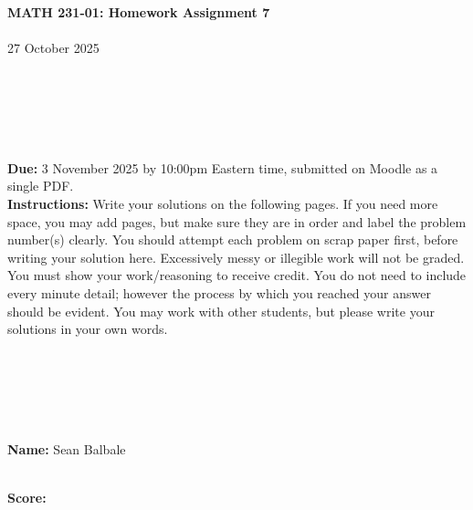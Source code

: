 \documentclass[reqno, 12pt]{amsart}
\begin{document}
\begin{center}
  {\bf MATH 231-01: Homework Assignment 7}\\~\\
  27 October 2025\\~\\~\\~\\~\\~\\
\end{center}

{\bf Due:} 3 November 2025 by 10:00pm Eastern time, submitted on Moodle as a single PDF.~\\


{\bf Instructions:} Write your solutions on the following pages. If you need more space, you may add pages, but make sure they are in order and label the problem number(s) clearly. You should attempt each problem on scrap paper first, before writing your solution here. Excessively messy or illegible work will not be graded. You must show your work/reasoning to receive credit. You do not need to include every minute detail; however the process by which you reached your answer should be evident. You may work with other students, but please write your solutions in your own words.

~\\~\\~\\~\\~\\
{\bf Name:} Sean Balbale

~\\
{\bf Score:}
\end{document}
